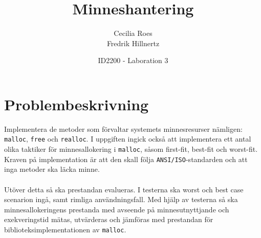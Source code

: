 \documentclass[a4paper]{article}
\title{Minneshantering}
\date{ID2200 - Laboration 3}
\author{Cecilia Roes \\ Fredrik Hillnertz}
\begin{document}

\maketitle

\section*{Problembeskrivning}
Implementera de metoder som förvaltar systemets minnesresurser nämligen: \texttt{malloc}, \texttt{free} och \texttt{realloc}. I uppgiften ingick också att implementera ett antal olika taktiker för minnesallokering i \texttt{malloc}, såsom first-fit, best-fit och worst-fit. Kraven på implementation är att den skall följa \texttt{ANSI/ISO}-standarden och att inga metoder ska läcka minne.
\\
\\
Utöver detta så ska prestandan evalueras. I testerna ska worst och best case scenarion ingå, samt rimliga användningsfall. Med hjälp av testerna så ska minnesallokeringens prestanda med avseende på minnesutnyttjande och exekveringstid mätas, utvärderas och jämföras med prestandan för biblioteksimplementationen av \texttt{malloc}.
\end{document}
